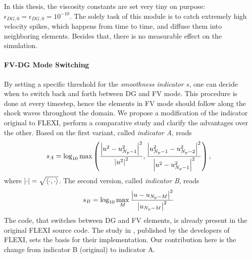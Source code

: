 In this thesis, the viscosity constants are set very tiny on purpose:
$\epsilon_{DG,0} = \epsilon_{DG,0} = 10^{-10}$. The solely task of this module
is to catch extremely high velocity spikes, which happens from time to time,
and diffuse them into neighboring elements. Besides that, there is no measurable
effect on the simulation.

\paragraph{FV-DG Mode Switching}
By setting a specific threshold for the \emph{smoothness indicator} $s$, one
can decide when to switch back and forth between DG and FV mode. This procedure
is done at every timestep, hence the elements in FV mode should follow along
the shock waves throughout the domain.  We propose a modification of the
indicator original to FLEXI, perform a comparative study and clarify the
advantages over the other.  Based on  the first
variant, called \emph{indicator
A}, reads
\begin{equation}
\label{eqn:indicator-A}
    s_A = \log_{10} \max \left(
        \frac{\left|u^2 - u_{N_p-1}^2\right|^2}{\left|u^2\right|^2},
        \frac{\left|u_{N_p-1}^2 - u_{N_p-2}^2\right|^2}{\left|u^2 - u_{N_p-1}^2\right|^2}
    \right),
\end{equation}
where $\left|\cdot\right| = \sqrt{\left\langle\cdot,\cdot\right\rangle}$.  The second version, called
\emph{indicator B}, reads
\begin{equation}
\label{eqn:indicator-B}
    s_B = \log_{10} \max_M \frac{\left|u - u_{N_p-M}\right|^2}{\left|u_{N_p-M}\right|^2}
\end{equation}
The code, that switches between DG and FV elements, is already present in the
original FLEXI source code. The study in \cite{balsara2007sub}, published by
the developers of FLEXI, sets the basis for their implementation. Our
contribution here is the change from indicator B (original) to indicator A.

